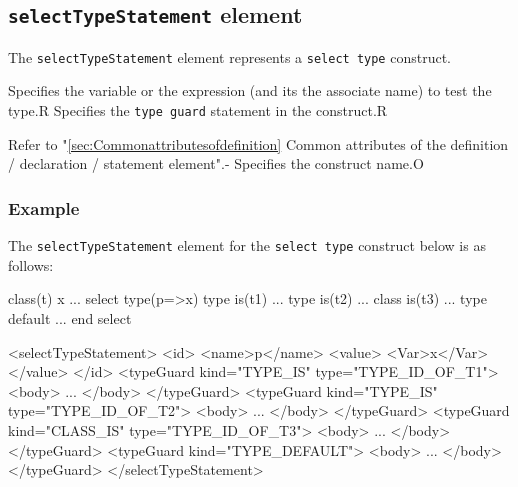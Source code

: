 \subsection{ {\tt selectTypeStatement} element}

The {\tt selectTypeStatement} element represents a {\tt select type} construct.


\begin{XcodeMLChildElements}
{Specifies the variable or the expression (and its the associate name) to test the type.}{R}
{Specifies the {\tt type guard} statement in the construct.}{R}
\end{XcodeMLChildElements}

\begin{XcodeMLAttributes}
{Refer to "\ref{sec:Commonattributesofdefinition} Common attributes of the definition / declaration / statement element".}{-}
{Specifies the construct name.}{O}
\end{XcodeMLAttributes}

\subsubsection*{Example}

The {\tt selectTypeStatement} element for the {\tt select type} construct below is as follows:
\vspace{2mm}

\begin{Fexample2008}
class(t) x
...
select type(p=>x)
type is(t1)
  ...
type is(t2)
  ...
class is(t3)
  ...
type default
  ...
end select
\end{Fexample2008}
\vspace{1mm}

\begin{XcodeMLFExample}
<selectTypeStatement>
  <id>
    <name>p</name>
    <value>
       <Var>x</Var>
    </value>
  </id>
  <typeGuard kind="TYPE_IS" type="TYPE_ID_OF_T1">
    <body>
      ...
    </body>
  </typeGuard>
  <typeGuard kind="TYPE_IS" type="TYPE_ID_OF_T2">
    <body>
      ...
    </body>
  </typeGuard>
  <typeGuard kind="CLASS_IS" type="TYPE_ID_OF_T3">
    <body>
      ...
    </body>
  </typeGuard>
  <typeGuard kind="TYPE_DEFAULT">
    <body>
      ...
    </body>
  </typeGuard>
</selectTypeStatement>
\end{XcodeMLFExample}


